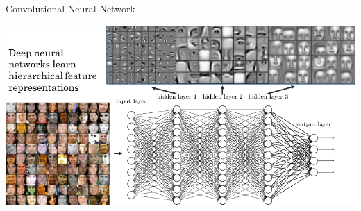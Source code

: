 \documentclass{beamer}
\begin{document}
{    \begin{frame}{Convolutional Neural Network}
      \begin{center}
        \includegraphics[width=\textwidth]{../img/ConvNet_hierarchy.png}
      \end{center}
    \end{frame}
  }

\end{document}
